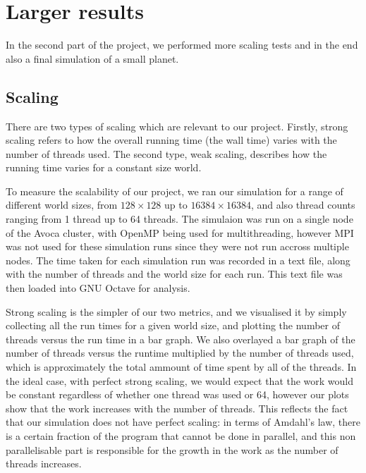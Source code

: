 \documentclass[a4paper]{article}
\begin{document}
\section{Larger results}

In the second part of the project, we performed more scaling tests and in the end also a final simulation of a small planet.

\subsection{Scaling}

There are two types of scaling which are relevant to our project. Firstly, strong scaling refers to how the overall running time (the wall time) varies with the number of threads used. The second type, weak scaling, describes how the running time varies for a constant size world.

To measure the scalability of our project, we ran our simulation for a range of different world sizes, from $128 \times 128$ up to $16384 \times 16384$, and also thread counts ranging from 1 thread up to 64 threads. The simulaion was run on a single node of the Avoca cluster, with OpenMP being used for multithreading, however MPI was not used for these simulation runs since they were not run accross multiple nodes. The time taken for each simulation run was recorded in a text file, along with the number of threads and the world size for each run. This text file was then loaded into GNU Octave for analysis.

Strong scaling is the simpler of our two metrics, and we visualised it by simply collecting all the run times for a given world size, and plotting the number of threads versus the run time in a bar graph. We also overlayed a bar graph of the number of threads versus the runtime multiplied by the number of threads used, which is approximately the total ammount of time spent by all of the threads. In the ideal case, with perfect strong scaling, we would expect that the work would be constant regardless of whether one thread was used or 64, however our plots show that the work increases with the number of threads. This reflects the fact that our simulation does not have perfect scaling: in terms of Amdahl's law, there is a certain fraction of the program that cannot be done in parallel, and this non parallelisable part is responsible for the growth in the work as the number of threads increases.
\end{document}
